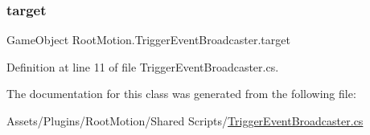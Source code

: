 \subsubsection{\texorpdfstring{target}{target}}
{\footnotesize\ttfamily Game\+Object Root\+Motion.\+Trigger\+Event\+Broadcaster.\+target}



Definition at line 11 of file Trigger\+Event\+Broadcaster.\+cs.



The documentation for this class was generated from the following file\+:\begin{DoxyCompactItemize}
\item 
Assets/\+Plugins/\+Root\+Motion/\+Shared Scripts/\mbox{\hyperlink{_trigger_event_broadcaster_8cs}{Trigger\+Event\+Broadcaster.\+cs}}\end{DoxyCompactItemize}
